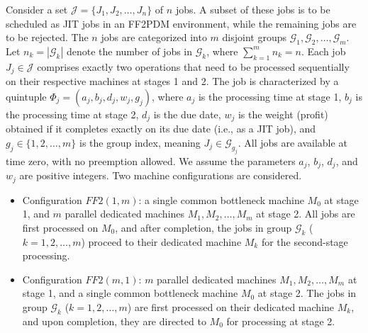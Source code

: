 \documentclass[12pt, eqno, limlimits]{article}
\begin{document}
\begin{sloppypar}
        Consider a set $\mathcal{J}=\{J_1, J_2, \ldots, J_n\}$ of $n$ jobs. A subset of these jobs is to be scheduled as JIT jobs in an FF2PDM environment, while the remaining jobs are to be rejected. The $n$ jobs are categorized into $m$ disjoint groups $\mathcal{G}_1, \mathcal{G}_2, \ldots, \mathcal{G}_m$. Let $n_k=|\mathcal{G}_k|$ denote the number of jobs in $\mathcal{G}_k$, where $\sum_{k=1}^m n_k=n$. Each job $J_j \in \mathcal{J}$ comprises exactly two operations that need to be processed sequentially on their respective machines at stages 1 and 2. The job is characterized by a quintuple $\Phi_j=(a_j, b_j, d_j, w_j, g_j)$, where $a_j$ is the processing time at stage 1, $b_j$ is the processing time at stage 2, $d_j$ is the due date, $w_j$ is the weight (profit) obtained if it completes exactly on its due date (i.e., as a JIT job), and $g_j \in \{1, 2, \ldots, m\}$ is the group index, meaning $J_j \in \mathcal{G}_{g_j}$. All jobs are available at time zero, with no preemption allowed. 
        We assume the parameters $a_j$, $b_j$, $d_j$, and $w_j$ are positive integers. Two machine configurations are considered.
        \begin{itemize}
            \item Configuration $FF2(1, m)$: a single common bottleneck machine $M_0$ at stage 1, and $m$ parallel dedicated machines $M_1, M_2, \ldots, M_m$ at stage 2. All jobs are first processed on $M_0$, and after completion, the jobs in group $\mathcal{G}_k$ ($k=1, 2, \ldots, m$) proceed to their dedicated machine $M_k$ for the second-stage processing.
            
            \item Configuration $FF2(m, 1)$: $m$ parallel dedicated machines $M_1, M_2, \ldots, M_m$ at stage 1, and a single common bottleneck machine $M_0$ at stage 2. The jobs in group $\mathcal{G}_k$ ($k=1, 2, \ldots, m$) are first processed on their dedicated machine $M_k$, and upon completion, they are directed to $M_0$ for processing at stage 2.	
        \end{itemize} 
        

\end{sloppypar}
\end{document}
